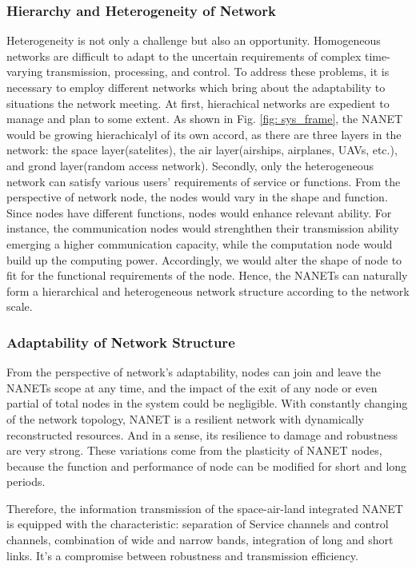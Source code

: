 \documentclass[journal,comsoc]{IEEEtran}
\begin{document}
			\subsubsection{Hierarchy and Heterogeneity of Network}
				Heterogeneity is not only a challenge but also an opportunity. 
				Homogeneous networks are difficult to adapt to the uncertain requirements of complex time-varying transmission, processing, and control.
				To address these problems, it is necessary to employ different networks which bring about the adaptability to situations the network meeting.
				At first, hierachical networks are expedient to manage and plan to some extent.
				As shown in Fig. \ref{fig: sys_frame}, the NANET would be growing hierachicalyl of its own accord, 
				as there are three layers in the network: the space layer(satelites), the air layer(airships, airplanes, UAVs, etc.), and grond layer(random access network).
				Secondly, only the heterogeneous network can satisfy various users' requirements of service or functions.
				From the perspective of network node, the nodes would vary in the shape and function.
				Since nodes have different functions, nodes would enhance relevant ability.
				For instance, the communication nodes would strenghthen their transmission ability emerging a higher communication capacity, while the computation node would build up the computing power.
				Accordingly, we would alter the shape of node to fit for the functional requirements of the node.
				Hence, the NANETs can naturally form a hierarchical and heterogeneous network structure  according to the network scale.
				
			\subsubsection{Adaptability of Network Structure}
				
				From the perspective of network's adaptability, nodes can join and leave the NANETs scope at any time, 
				and the impact of the exit of any node or even partial of total nodes in the system could be negligible.
				With constantly changing of the network topology,  NANET is a resilient network with dynamically reconstructed resources.
				And in a sense, its resilience to damage and robustness are very strong.
				These variations come from the plasticity of NANET nodes, because the function and performance of node can be modified for short and long periods.
		
		Therefore, the information transmission of the space-air-land integrated NANET is equipped with the characteristic: separation of Service channels and control channels, combination of wide and narrow bands, integration of long and short links.
		It's a compromise between robustness and transmission efficiency.
		
\end{document}
